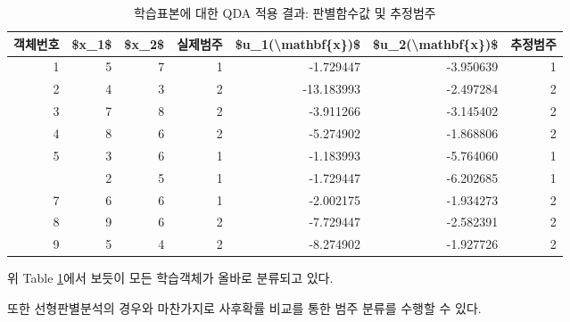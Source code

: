 \documentclass[]{book}
\begin{document}
\begin{table}[t]

\caption{\label{tab:qda-discriminant-result}학습표본에 대한 QDA 적용 결과: 판별함수값 및 추정범주}
\centering
\begin{tabular}{rrrrrrr}
\toprule
객체번호 & \$x\_1\$ & \$x\_2\$ & 실제범주 & \$u\_1(\textbackslash{}mathbf\{x\})\$ & \$u\_2(\textbackslash{}mathbf\{x\})\$ & 추정범주\\
\midrule
1 & 5 & 7 & 1 & -1.729447 & -3.950639 & 1\\
2 & 4 & 3 & 2 & -13.183993 & -2.497284 & 2\\
3 & 7 & 8 & 2 & -3.911266 & -3.145402 & 2\\
4 & 8 & 6 & 2 & -5.274902 & -1.868806 & 2\\
5 & 3 & 6 & 1 & -1.183993 & -5.764060 & 1\\
\addlinespace
6 & 2 & 5 & 1 & -1.729447 & -6.202685 & 1\\
7 & 6 & 6 & 1 & -2.002175 & -1.934273 & 2\\
8 & 9 & 6 & 2 & -7.729447 & -2.582391 & 2\\
9 & 5 & 4 & 2 & -8.274902 & -1.927726 & 2\\
\bottomrule
\end{tabular}
\end{table}

위 Table \ref{tab:qda-discriminant-result}에서 보듯이 모든 학습객체가 올바로 분류되고 있다.

또한 선형판별분석의 경우와 마찬가지로 사후확률 비교를 통한 범주 분류를 수행할 수 있다.
\end{document}
